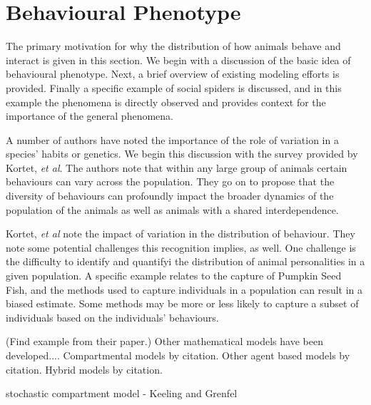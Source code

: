 \documentclass[12pt]{article}
\begin{document}
\section{Behavioural Phenotype}
\label{section:behaviouralPhenotype}

The primary motivation for why the distribution of how animals behave
and interact is given in this section. We begin with a discussion of
the basic idea of behavioural phenotype. Next, a brief overview of
existing modeling efforts is provided. Finally a specific example of
social spiders is discussed, and in this example the phenomena is
directly observed and provides context for the importance of the
general phenomena.

A number of authors have noted the importance of the role of variation
in a species' habits or
genetics\cite{doi:10.1111/j.1461-0248.2010.01536.x,WRIGHT2016175,doi:10.1086/687235}. We
begin this discussion with the survey provided by Kortet, \textit{et
  al}\cite{doi:10.1111/j.1461-0248.2010.01536.x}. The authors note
that within any large group of animals certain behaviours can vary
across the population. They go on to propose that the diversity of
behaviours can profoundly impact the broader dynamics of the
population of the animals as well as animals with a shared
interdependence.

Kortet, \textit{et al}\cite{doi:10.1111/j.1461-0248.2010.01536.x} note
the impact of variation in the distribution of behaviour. They note
some potential challenges this recognition implies, as well. One
challenge is the difficulty to identify and quantifyi the distribution
of animal personalities in a given population. A specific example
relates to the capture of Pumpkin Seed
Fish\cite{doi:10.1037/0735-7036.107.3.250}, and the methods used to
capture individuals in a population can result in a biased estimate.
Some methods may be more or less likely to capture a subset of
individuals based on the individuals' behaviours.


(Find example from their paper.)  Other mathematical models have been
developed.... Compartmental models by citation. Other agent based
models by citation. Hybrid models by citation.


stochastic compartment model - Keeling and Grenfel
\end{document}
